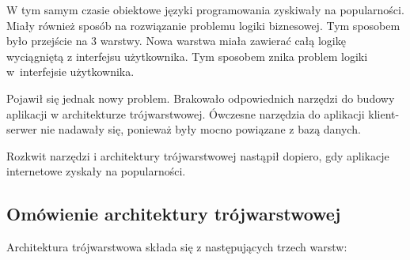 \documentclass[a4paper,onecolumn,oneside,11pt,wide,floatssmall]{mwrep}
\theoremstyle{definition}
\theoremstyle{plain}%
\theoremstyle{remark}
\begin{document}
W tym samym czasie obiektowe języki programowania zyskiwały na popularności. Miały również sposób na rozwiązanie 
problemu logiki biznesowej. Tym sposobem było przejście na 3 warstwy. Nowa warstwa miała zawierać całą logikę 
wyciągniętą z interfejsu użytkownika. Tym sposobem znika problem logiki \mbox{w interfejsie} użytkownika.

Pojawił się jednak nowy problem. Brakowało odpowiednich narzędzi do budowy aplikacji w architekturze trójwarstwowej. 
Ówczesne narzędzia do aplikacji klient-serwer nie nadawały się, ponieważ były mocno powiązane z bazą danych. 

Rozkwit narzędzi i architektury trójwarstwowej nastąpił dopiero, gdy aplikacje internetowe zyskały na popularności.

\subsection{Omówienie architektury trójwarstwowej}

Architektura trójwarstwowa składa się z następujących trzech warstw:
\end{document}
